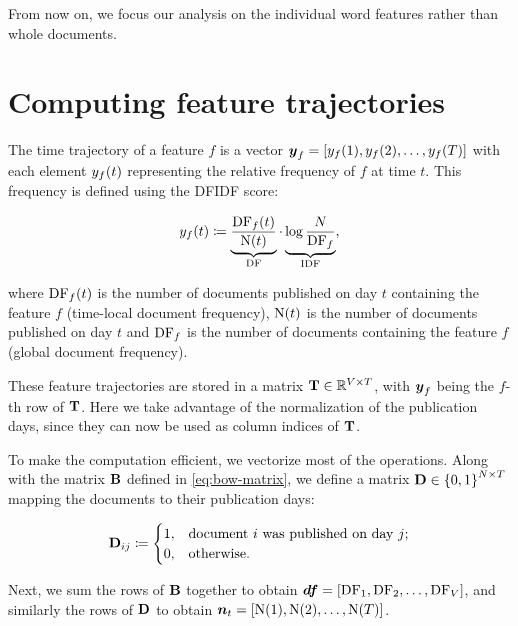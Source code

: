 From now on, we focus our analysis on the individual word features rather than whole documents.


\section{Computing feature trajectories}
The time trajectory of a feature $f$ is a vector $\vect{\traj}_f = \left[ \traj_{f}(1), \traj_{f}(2), \dots, \traj_{f}(\streamlen) \right]$ with each element $y_{f}(t)$ representing the relative frequency of $f$ at time $t$. This frequency is defined using the DFIDF score:

\begin{equation}
	y_{f}(t) \coloneqq \underbrace{\frac{\text{DF}_{f}(t)}{\text{N}(t)}}_{\text{DF}} \cdot \underbrace{\log{\frac{N}{\text{DF}_{f}}}}_{\text{IDF}},
\end{equation}

where $\text{DF}_{f}(t)$ is the number of documents published on day $t$ containing the feature $f$ (time-local document frequency), $\text{N}(t)$ is the number of documents published on day $t$ and $\text{DF}_{f}$ is the number of documents containing the feature $f$ (global document frequency).

These feature trajectories are stored in a matrix $\mathbf{T} \in \mathbb{R}^{V \times T}$, with $\vect{\traj}_f$ being the $f$-th row of $\mathbf{T}$. Here we take advantage of the normalization of the publication days, since they can now be used as column indices of $\mathbf{T}$.

To make the computation efficient, we vectorize most of the operations. Along with the matrix $\mathbf{B}$ defined in \ref{eq:bow-matrix}, we define a matrix $\mathbf{D} \in \left\{ 0, 1 \right\}^{N \times T}$ mapping the documents to their publication days:

\begin{equation}
	\mathbf{D}_{ij} \coloneqq
	\begin{cases}
		1, & \text{document}~i~\text{was published on day}~j \text{;} \\
		0, & \text{otherwise}.
	\end{cases}
\end{equation}

Next, we sum the rows of $\mathbf{B}$ together to obtain $\vect{\df} = \left[ \text{\df}_{1}, \text{\df}_{2}, \dots, \text{\df}_{\featcount} \right]$, and similarly the rows of $\mathbf{D}$ to obtain $\vect{\doccount}_{t} = \left[ \text{\doccount}(1), \text{\doccount}(2), \dots, \text{\doccount}(\streamlen) \right]$.

